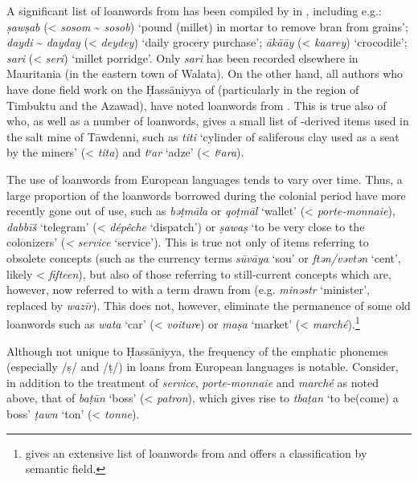 \documentclass[output=paper]{langsci/langscibook}
\begin{document}
A significant list of {loanwords} from  has been compiled by \citet{Heath2004} in , including e.g.: \textit{ṣawṣab} (< \textit{sosom} \~{} \textit{sosob}) ‘pound (millet) in mortar to remove bran from grains’; \textit{daydi} \~{} \textit{dayday} (< \textit{deydey}) ‘daily grocery purchase’; \textit{ākā{\R}āy} (< \textit{kaarey}) ‘crocodile’; \textit{sari} (< \textit{seri}) ‘millet porridge’. Only \textit{sari} has been recorded elsewhere in Mauritania (in the eastern town of Walata). On the other hand, all authors who have done field work on the Ḥassāniyya of  (particularly in the region of Timbuktu and the Azawad), have noted {loanwords} from . This is true also of \citet{Clauzel1960} who, as well as a number of  {loanwords}, gives a small list of -derived items used in the salt mine of Tāwdenni, such as \textit{titi} ‘cylinder of saliferous clay used as a seat by the miners’ (< \textit{tita}) and \textit{tʸar} ‘adze’ (< \textit{tʸara}).


The use of {loanwords} from European languages tends to vary over time. Thus, a large proportion of the  {loanwords} borrowed during the {colonial} period have more recently gone out of use, such as \textit{bə{\R}ṭmāla} or \textit{qo{\R}ṭmāl} ‘wallet’ (< \textit{porte-monnaie}), \textit{dabbīš} ‘telegram’ (< \textit{dépêche} ‘dispatch’) or \textit{ṣa{\R}waṣ} ‘to be very close to the colonizers’ (\textit{<} \textit{service} ‘service’). This is true not only of items referring to obsolete concepts (such as the currency terms \textit{sūvāya} ‘sou’ or \textit{ftən/vəvtən} ‘cent’, likely < \textit{fifteen}), but also of those referring to still-current concepts which are, however, now referred to with a term drawn from   (e.g. \textit{minəstr} ‘minister’, replaced by \textit{wazīr}). This does not, however, eliminate the permanence of some old {loanwords} such as \textit{wata} ‘car’ (< \textit{voiture}) or \textit{ma{\R}ṣa} ‘market’ (< \textit{marché}).\footnote{\citet{OuldMohamedBaba2003} gives an extensive list of {loanwords} from  and offers a classification by semantic field.}

Although not unique to Ḥassāniyya, the {frequency} of the {emphatic} phonemes (especially /ṣ/ and /ṭ/) in loans from European languages is notable. Consider, in addition to the treatment of \textit{service}, \textit{porte-monnaie} and \textit{marché} as noted above, that of \textit{baṭ{\R}ūn} ‘boss’ (< \textit{patron}), which gives rise to \textit{tbaṭ{\R}an} ‘to be(come) a boss’ \textit{ṭawn} ‘ton’ (< \textit{tonne}).
\end{document}
